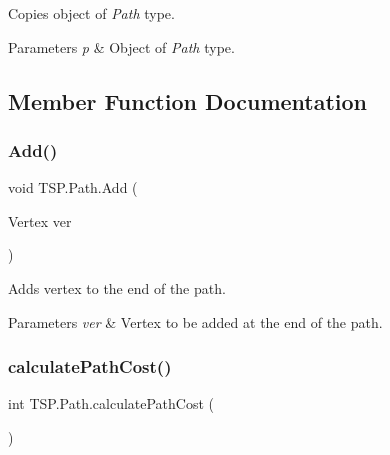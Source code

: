 Copies object of {\itshape Path}  type. 


\begin{DoxyParams}{Parameters}
{\em p} & Object of {\itshape Path}  type.\\
\hline
\end{DoxyParams}


\subsection{Member Function Documentation}
\mbox{\label{class_t_s_p_1_1_path_af665136228859abe5ce93796067516ee}} 
\subsubsection{\texorpdfstring{Add()}{Add()}}
{\footnotesize\ttfamily void T\+S\+P.\+Path.\+Add (\begin{DoxyParamCaption}\item[{Vertex}]{ver }\end{DoxyParamCaption})\hspace{0.3cm}{\ttfamily [inline]}}



Adds vertex to the end of the path. 


\begin{DoxyParams}{Parameters}
{\em ver} & Vertex to be added at the end of the path.\\
\hline
\end{DoxyParams}
\mbox{\label{class_t_s_p_1_1_path_a181ae650b5030f9149d5cd59cb144f07}} 
\subsubsection{\texorpdfstring{calculate\+Path\+Cost()}{calculatePathCost()}}
{\footnotesize\ttfamily int T\+S\+P.\+Path.\+calculate\+Path\+Cost (\begin{DoxyParamCaption}{ }\end{DoxyParamCaption})\hspace{0.3cm}{\ttfamily [inline]}}



